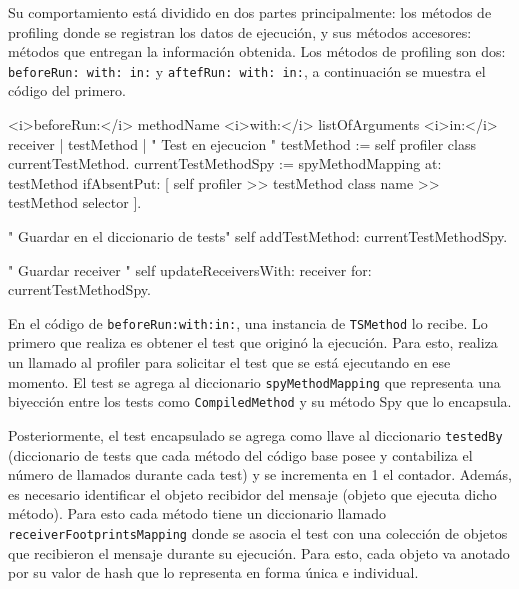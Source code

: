 \newpage
\par Su comportamiento está dividido en dos partes principalmente: los métodos de profiling donde se registran los datos de ejecución, y sus métodos accesores: métodos que entregan la información obtenida. Los métodos de profiling son dos: {\tt beforeRun: with: in:} y {\tt aftefRun: with: in:}, a continuación se muestra el código del primero. 

\begin{codeWithLineNumbers}
<i>beforeRun:</i> methodName <i>with:</i> listOfArguments <i>in:</i> receiver
	| testMethod |
	" Test en ejecucion "
	testMethod := self profiler class currentTestMethod.
	currentTestMethodSpy := 
			spyMethodMapping at: testMethod ifAbsentPut: 
				[ self profiler >> testMethod class name >> testMethod selector ].
		
	" Guardar en el diccionario de tests"	
	self addTestMethod: currentTestMethodSpy.

	" Guardar receiver "
	self updateReceiversWith: receiver for: currentTestMethodSpy.

\end{codeWithLineNumbers}


\par En el código de {\tt beforeRun:with:in:}, una instancia de {\tt TSMethod} lo recibe. Lo primero que realiza es obtener el test que originó la ejecución. Para esto, realiza un llamado al profiler para solicitar el test que se está ejecutando en ese momento. El test se agrega al diccionario {\tt spyMethodMapping} que representa una biyección entre los tests como {\tt CompiledMethod} y su método Spy que lo encapsula. 

\par Posteriormente, el test encapsulado se agrega como llave al diccionario {\tt testedBy} (diccionario de tests que cada método del código base posee y contabiliza el número de llamados durante cada test) y se incrementa en 1 el contador. Además, es necesario identificar el objeto recibidor del mensaje (objeto que ejecuta dicho método). Para esto cada método tiene un diccionario llamado {\tt receiverFootprintsMapping} donde se asocia el test con una colección de objetos que recibieron el mensaje durante su ejecución. Para esto, cada objeto va anotado por su valor de hash que lo representa en forma única e individual.

